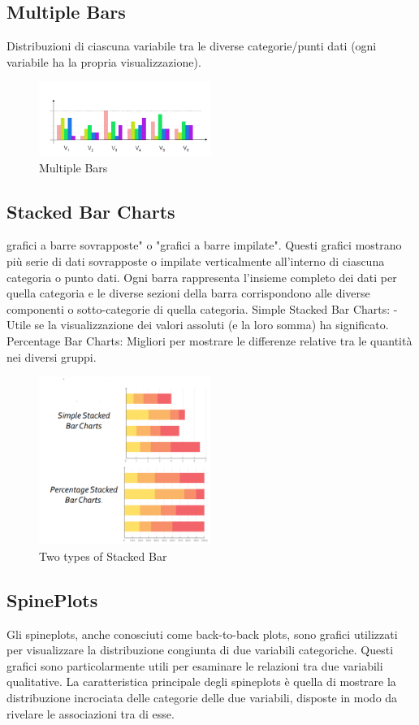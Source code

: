 \subsection{Multiple Bars}
Distribuzioni di ciascuna variabile tra le diverse categorie/punti dati (ogni variabile ha la propria visualizzazione).
\begin{figure}[H]
  \centering
  \includegraphics[width=0.5\textwidth]{images/Multiplebars.png} 
  \caption{Multiple Bars}
  \label{fig:immagine}
\end{figure}
\subsection{Stacked Bar Charts}
grafici a barre sovrapposte" o "grafici a barre impilate". Questi grafici mostrano più serie di dati sovrapposte o impilate verticalmente all'interno di ciascuna categoria o punto dati. Ogni barra rappresenta l'insieme completo dei dati per quella categoria e le diverse sezioni della barra corrispondono alle diverse componenti o sotto-categorie di quella categoria.
Simple Stacked Bar Charts:  - Utile se la visualizzazione dei valori assoluti (e la loro somma) ha significato.
Percentage Bar Charts: Migliori per mostrare le differenze relative tra le quantità nei diversi gruppi.
\begin{figure}[H]
  \centering
  \includegraphics[width=0.5\textwidth]{images/StackedBarm.png} 
  \caption{Two types of Stacked Bar}
  \label{fig:immagine}
\end{figure}
\subsection{SpinePlots}
Gli spineplots, anche conosciuti come back-to-back plots, sono grafici utilizzati per visualizzare la distribuzione congiunta di due variabili categoriche. Questi grafici sono particolarmente utili per esaminare le relazioni tra due variabili qualitative.
La caratteristica principale degli spineplots è quella di mostrare la distribuzione incrociata delle categorie delle due variabili, disposte in modo da rivelare le associazioni tra di esse. 
